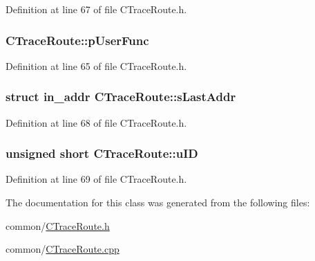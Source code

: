 \-Definition at line 67 of file \-C\-Trace\-Route.\-h.

\hypertarget{class_c_trace_route_a7876c156fff35d015ad8c7e3d2160d7f}{
\subsubsection[{p\-User\-Func}]{ {\bf \-C\-Trace\-Route\-::p\-User\-Func}}}\label{class_c_trace_route_a7876c156fff35d015ad8c7e3d2160d7f}


\-Definition at line 65 of file \-C\-Trace\-Route.\-h.

\hypertarget{class_c_trace_route_a364ba2e572488ba888b175b9e0025ae7}{
\subsubsection[{s\-Last\-Addr}]{\setlength{\rightskip}{0pt plus 5cm}struct in\-\_\-addr {\bf \-C\-Trace\-Route\-::s\-Last\-Addr}}}\label{class_c_trace_route_a364ba2e572488ba888b175b9e0025ae7}


\-Definition at line 68 of file \-C\-Trace\-Route.\-h.

\hypertarget{class_c_trace_route_a23490973cbeb2c4cbf47376395efe93b}{
\subsubsection[{u\-I\-D}]{\setlength{\rightskip}{0pt plus 5cm}unsigned short {\bf \-C\-Trace\-Route\-::u\-I\-D}}}\label{class_c_trace_route_a23490973cbeb2c4cbf47376395efe93b}


\-Definition at line 69 of file \-C\-Trace\-Route.\-h.



\-The documentation for this class was generated from the following files\-:\begin{DoxyCompactItemize}
\item 
common/\hyperlink{_c_trace_route_8h}{\-C\-Trace\-Route.\-h}\item 
common/\hyperlink{_c_trace_route_8cpp}{\-C\-Trace\-Route.\-cpp}\end{DoxyCompactItemize}
